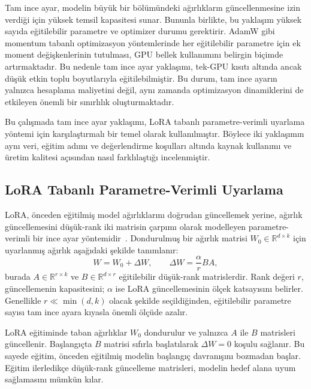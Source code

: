 \documentclass[11pt]{article}
\begin{document}
Tam ince ayar, modelin büyük bir bölümündeki ağırlıkların güncellenmesine
izin verdiği için yüksek temsil kapasitesi sunar. Bununla birlikte, bu yaklaşım
yüksek sayıda eğitilebilir parametre ve optimizer durumu gerektirir. AdamW gibi
momentum tabanlı optimizasyon yöntemlerinde her eğitilebilir parametre için
ek moment değişkenlerinin tutulması, GPU bellek kullanımını belirgin biçimde
artırmaktadır. Bu nedenle tam ince ayar yaklaşımı, tek-GPU kısıtı altında
ancak düşük etkin toplu boyutlarıyla eğitilebilmiştir. Bu durum, tam ince
ayarın yalnızca hesaplama maliyetini değil, aynı zamanda optimizasyon
dinamiklerini de etkileyen önemli bir sınırlılık oluşturmaktadır.

Bu çalışmada tam ince ayar yaklaşımı, LoRA tabanlı parametre-verimli uyarlama
yöntemi için karşılaştırmalı bir temel olarak kullanılmıştır. Böylece iki
yaklaşımın aynı veri, eğitim adımı ve değerlendirme koşulları altında
kaynak kullanımı ve üretim kalitesi açısından nasıl farklılaştığı
incelenmiştir.

\subsection{LoRA Tabanlı Parametre-Verimli Uyarlama}

LoRA, önceden eğitilmiş model ağırlıklarını doğrudan güncellemek yerine,
ağırlık güncellemesini düşük-rank iki matrisin çarpımı olarak modelleyen
parametre-verimli bir ince ayar yöntemidir~\cite{lora}. Dondurulmuş bir ağırlık
matrisi $W_0 \in \mathbb{R}^{d \times k}$ için uyarlanmış ağırlık aşağıdaki
şekilde tanımlanır:
\begin{equation}
W = W_0 + \Delta W,
\qquad
\Delta W = \frac{\alpha}{r}BA,
\label{eq:lora}
\end{equation}
burada $A \in \mathbb{R}^{r \times k}$ ve $B \in \mathbb{R}^{d \times r}$
eğitilebilir düşük-rank matrislerdir. Rank değeri $r$, güncellemenin
kapasitesini; $\alpha$ ise LoRA güncellemesinin ölçek katsayısını belirler.
Genellikle $r \ll \min(d,k)$ olacak şekilde seçildiğinden, eğitilebilir
parametre sayısı tam ince ayara kıyasla önemli ölçüde azalır.

LoRA eğitiminde taban ağırlıklar $W_0$ dondurulur ve yalnızca $A$ ile $B$
matrisleri güncellenir. Başlangıçta $B$ matrisi sıfırla başlatılarak
$\Delta W = 0$ koşulu sağlanır. Bu sayede eğitim, önceden eğitilmiş modelin
başlangıç davranışını bozmadan başlar. Eğitim ilerledikçe düşük-rank
güncelleme matrisleri, modelin hedef alana uyum sağlamasını mümkün kılar.
\end{document}
